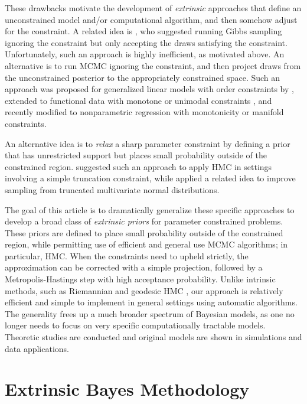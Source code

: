 \documentclass[10pt]{article}
\DeclareMathOperator{\1}{\mathbbm{1}}
\begin{document}
These drawbacks motivate the development of {\em extrinsic} approaches that define an unconstrained model and/or computational algorithm, and then somehow adjust for the constraint. A related idea is \cite{gelfand1992bayesian}, who suggested running Gibbs sampling ignoring the constraint but only accepting the draws satisfying the constraint. Unfortunately, such an approach is highly inefficient, as motivated above. An alternative is to run MCMC ignoring the constraint, and then project draws from the unconstrained posterior to the appropriately constrained space. Such an approach was proposed for generalized linear models with order constraints by \cite{dunson2003bayesian}, extended to functional data with monotone or unimodal constraints \cite{gunn2005transformation}, and recently modified to nonparametric regression with monotonicity \cite{lin2014monogp} or manifold \cite{lin2016extrinsic} constraints.

An alternative idea is to {\em relax} a sharp parameter constraint by defining a prior that has unrestricted support but places small probability outside of the constrained region. \cite{neal2011mcmc} suggested such an approach to apply HMC in settings involving a simple truncation constraint, while \cite{pakman2014exact} applied a related idea to improve sampling from truncated multivariate normal distributions.

The goal of this article is to dramatically generalize these specific approaches to develop a broad class of {\em extrinsic priors} for parameter constrained problems. These priors are defined to place small probability outside of the constrained region, while permitting use of efficient and general use MCMC algorithms; in particular, HMC. When the constraints need to upheld strictly, the approximation can be corrected with a simple projection, followed by a Metropolis-Hastings step with high acceptance probability.
Unlike intrinsic methods, such as Riemannian and geodesic HMC \citep{girolami2011riemann,byrne2013geodesic}, our approach is
relatively efficient and simple to implement in general settings using automatic algorithms. The generality frees up a much broader spectrum of Bayesian models, as one no longer needs to focus on very specific computationally tractable models.
Theoretic studies are conducted and original models are shown in simulations and data applications.

\section{Extrinsic Bayes Methodology}
\end{document}
